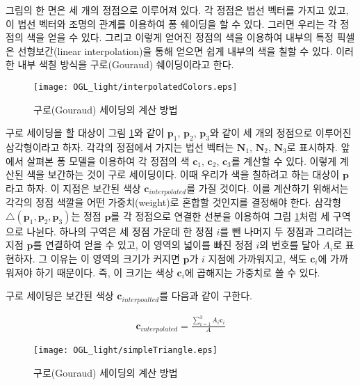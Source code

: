 그림의 한 면은 세 개의 정점으로 이루어져 있다. 각 정점은 법선 벡터를 가지고 있고, 이 법선 벡터와 조명의 관계를 이용하여 퐁 쉐이딩을 할 수 있다. 그러면 우리는 각 정점의 색을 얻을 수 있다. 그리고 이렇게 얻어진 정점의 색을 이용하여 내부의 특정 픽셀은 선형보간(linear interpolation)을 통해 얻으면 쉽게 내부의 색을 칠할 수 있다. 이러한 내부 색칠 방식을 구로(Gouraud) 쉐이딩이라고 한다. 

\begin{figure}[h!]
  \centering
    \texttt{[image: OGL\_light/interpolatedColors.eps]}
    \caption{구로(Gouraud) 세이딩의 계산 방법}
    \label{fig:OGL_light:interpolatedColors}
\end{figure}

구로 세이딩을 할 대상이 그림 \ref{fig:OGL_light:interpolatedColors}와 같이 $\mathbf p_1$, $\mathbf p_2$, $\mathbf p_3$와 같이 세 개의 정점으로 이루어진
삼각형이라고 하자. 각각의 정점에서 가지는 법선 벡터는 $\mathbf N_1$, $\mathbf N_2$, $\mathbf N_3$로 표시하자.
앞에서 살펴본 퐁 모델을 이용하여 각 정점의 색 $\mathbf c_1$, $\mathbf c_2$, $\mathbf c_3$를 계산할 수 있다.
이렇게 계산된 색을 보간하는 것이 구로 세이딩이다. 이때 우리가 색을 칠하려고 하는 대상이 $\mathbf p$라고 하자.
이 지점은 보간된 색상 $\mathbf c_{interpolated}$를 가질 것이다.
이를 계산하기 위해서는 각각의 정점 색깔을 어떤 가중치(weight)로 혼합할 것인지를 결정해야 한다.
삼각형 $\triangle (\mathbf p_1, \mathbf p_2, \mathbf p_3 )$는 정점 $\mathbf p$를 각 정점으로 연결한 선분을 이용하여
그림 \ref{fig:OGL_light:interpolatedColors}처럼 세 구역으로 나뉜다. 하나의 구역은 세 정점 가운데 한 정점 $i$를 뺀 나머지 
두 정점과 그리려는 지점 $\mathbf p$를 연결하여 얻을 수 있고, 이 영역의 넓이를 빠진 정점 $i$의 번호를 달아 $A_i$로 표현하자.
그 이유는 이 영역의 크기가 커지면 $\mathbf p$가 $i$ 지점에 가까워지고, 색도 $\mathbf c_i$에 가까워져야 하기 때문이다.
즉, 이 크기는 색상 $\mathbf c_i$에 곱해지는 가중치로 쓸 수 있다.

구로 세이딩은 보간된 색상 $\mathbf c_{interpoalted}$를 다음과 같이 구한다.

\begin{eqnarray}
\mathbf c_{interpolated} = \frac{\sum_{i=1}^3 A_i \mathbf c_i}{A}
\end{eqnarray}




\begin{figure}[h!]
  \centering
    \texttt{[image: OGL\_light/simpleTriangle.eps]}
    \caption{구로(Gouraud) 세이딩의 계산 방법}
    \label{fig:OGL_light:simpleTriangle}
\end{figure}

